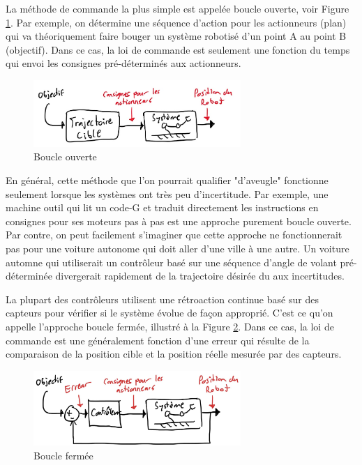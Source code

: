 La méthode de commande la plus simple est appelée boucle ouverte, voir Figure \ref{fig:openloop}. Par exemple, on détermine une séquence d'action pour les actionneurs (plan) qui va théoriquement faire bouger un système robotisé d'un point A au point B (objectif). Dans ce cas, la loi de commande est seulement une fonction du temps qui envoi les consignes pré-déterminés aux actionneurs. 
\begin{figure}[htbp]
	\centering
		\includegraphics[width=0.7\textwidth]{fig/openloop.jpg}
	\caption{Boucle ouverte}
	\label{fig:openloop}
\end{figure}

En général, cette méthode que l'on pourrait qualifier "d'aveugle" fonctionne seulement lorsque les systèmes ont très peu d'incertitude. Par exemple, une machine outil qui lit un code-G et traduit directement les instructions en consignes pour ses moteurs pas à pas est une approche purement boucle ouverte. Par contre, on peut facilement s'imaginer que cette approche ne fonctionnerait pas pour une voiture autonome qui doit aller d'une ville à une autre. Un voiture automne qui utiliserait un contrôleur basé sur une séquence d'angle de volant pré-déterminée divergerait rapidement de la trajectoire désirée du aux incertitudes. 

La plupart des contrôleurs utilisent une rétroaction continue basé sur des capteurs pour vérifier si le système évolue de façon approprié. C'est ce qu'on appelle l'approche boucle fermée,  illustré à la Figure \ref{fig:closedloop}. Dans ce cas, la loi de commande est une généralement fonction d'une erreur qui résulte de la comparaison de la position cible et la position réelle mesurée par des capteurs. 
\begin{figure}[htbp]
	\centering
		\includegraphics[width=0.7\textwidth]{fig/closedloop.jpg}
	\caption{Boucle fermée}
	\label{fig:closedloop}
\end{figure}

